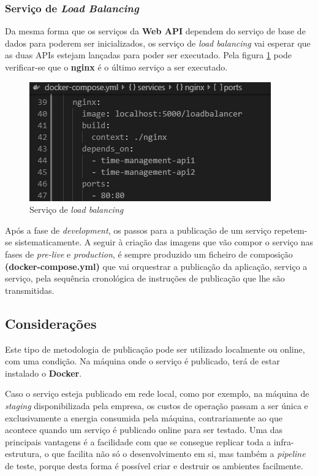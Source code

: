 \subsubsection{Serviço de \textit{Load Balancing}}

\hspace{1cm}Da mesma forma que os serviços da \textbf{Web API} dependem do serviço de base de dados para poderem ser inicializados, os serviço de \textit{load balancing} vai esperar que as duas APIs estejam lançadas para poder ser executado. Pela figura \ref{Fig:Fig95} pode verificar-se que o \textbf{nginx} é o último serviço a ser executado.

\begin{figure}[hbt!]
\centering
\includegraphics[width=0.45\linewidth]{Cap7/TimeManagementLoadBalancing.png}
\caption{Serviço de \textit{load balancing}}
\label{Fig:Fig95}
\end{figure}

\hspace{1cm}Após a fase de \textit{development}, os passos para a publicação de um serviço repetem-se sistematicamente. A seguir à criação das imagens que vão compor o serviço nas fases de \textit{pre-live} e \textit{production}, é sempre produzido um ficheiro de composição \textbf{(docker-compose.yml)} que vai orquestrar a publicação da aplicação, serviço a serviço, pela sequência cronológica de instruções de publicação que lhe são transmitidas.

\subsection{Considerações}

\hspace{1cm}Este tipo de metodologia de publicação pode ser utilizado localmente ou online, com uma condição. Na máquina onde o serviço é publicado, terá de estar instalado o \textbf{Docker}.

\hspace{1cm}Caso o serviço esteja publicado em rede local, como por exemplo, na máquina de \textit{staging} disponibilizada pela empresa, os custos de operação passam a ser única e exclusivamente a energia consumida pela máquina, contrariamente ao que acontece quando um serviço é publicado online para ser testado. Uma das principais vantagens é a facilidade com que se consegue replicar toda a infra-estrutura, o que facilita não só o desenvolvimento em si, mas também a \textit{pipeline} de teste, porque desta forma é possível criar e destruir os ambientes facilmente.

